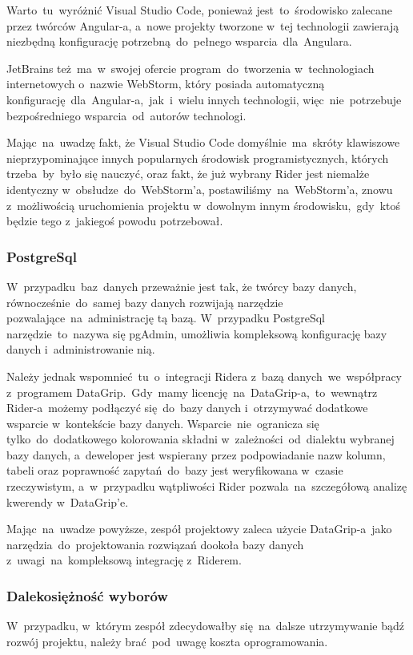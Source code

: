 Warto~tu~wyróżnić Visual Studio Code, ponieważ jest~to~środowisko zalecane przez twórców Angular-a, a~nowe projekty tworzone w~tej technologii zawierają niezbędną konfigurację potrzebną~do~pełnego wsparcia~dla~Angulara.

JetBrains też~ma~w~swojej ofercie program~do~tworzenia w~technologiach internetowych o~nazwie WebStorm, który posiada automatyczną konfigurację~dla~Angular-a,~jak~i~wielu innych technologii, więc~nie~potrzebuje bezpośredniego wsparcia~od~autorów technologi.

Mając~na~uwadzę fakt, że Visual Studio Code domyślnie~ma~skróty klawiszowe nieprzypominające innych popularnych środowisk programistycznych, których trzeba~by~było się nauczyć, oraz fakt, że już wybrany Rider jest niemalże identyczny w~obsłudze~do~WebStorm'a, postawiliśmy~na~WebStorm'a, znowu z~możliwością uruchomienia projektu w~dowolnym innym środowisku,~gdy~ktoś będzie tego z~jakiegoś powodu potrzebował.

\subsubsection{PostgreSql}
W~przypadku~baz~danych przeważnie jest tak, że twórcy bazy danych, równocześnie~do~samej bazy danych rozwijają narzędzie pozwalające~na~administrację tą bazą.
W~przypadku PostgreSql narzędzie~to~nazywa się pgAdmin, umożliwia kompleksową konfigurację bazy danych i~administrowanie nią.

Należy jednak wspomnieć~tu~o~integracji Ridera z~bazą danych~we~współpracy z~programem DataGrip.~Gdy~mamy licencję~na~DataGrip-a,~to~wewnątrz Rider-a~możemy podłączyć się~do~bazy danych i~otrzymywać dodatkowe wsparcie w~kontekście bazy danych.
Wsparcie~nie~ogranicza się tylko~do~dodatkowego kolorowania składni w~zależności~od~dialektu wybranej bazy danych, a~deweloper jest wspierany przez podpowiadanie nazw kolumn, tabeli oraz poprawność zapytań~do~bazy jest  weryfikowana w~czasie rzeczywistym, a~w~przypadku wątpliwości Rider pozwala~na~szczegółową analizę kwerendy w~DataGrip'e.

Mając~na~uwadze powyższe, zespół projektowy zaleca użycie DataGrip-a~jako narzędzia~do~projektowania rozwiązań dookoła bazy danych z~uwagi~na~kompleksową integrację z~Riderem.

\subsubsection{Dalekosiężność wyborów}
W~przypadku, w~którym zespół zdecydowałby się~na~dalsze utrzymywanie bądź rozwój projektu, należy brać~pod~uwagę koszta oprogramowania.

